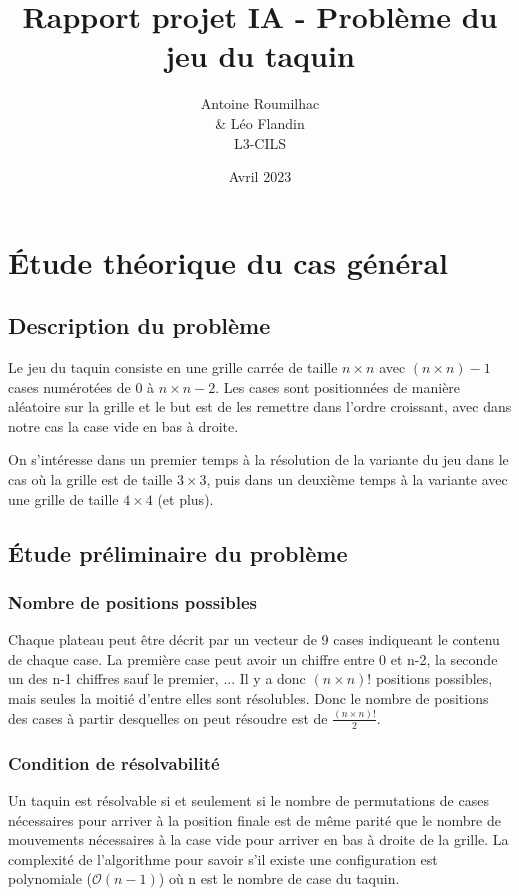 \documentclass[a4paper, 12pt]{article}
\title{Rapport projet IA - Problème du jeu du taquin}
\author{Antoine Roumilhac\\
    \& Léo Flandin\\
    L3-CILS}
\date{Avril 2023}
\begin{document}
\maketitle

\section{Étude théorique du cas général}

\subsection{Description du problème}
Le jeu du taquin consiste en une grille carrée de taille $n\times n$ avec $(n\times n) - 1$ cases numérotées de 0 à $n \times n - 2$.
Les cases sont positionnées de manière aléatoire sur la grille et le but est de les remettre dans l'ordre croissant, avec dans notre cas la case vide en bas à droite.


On s'intéresse dans un premier temps à la résolution de la variante du jeu dans le cas où la grille est de taille $3 \times 3$, puis dans un deuxième temps à la variante avec une grille de taille $4 \times 4$ (et plus).

\subsection{Étude préliminaire du problème}

\subsubsection{Nombre de positions possibles}
Chaque plateau peut être décrit par un vecteur de 9 cases indiqueant le contenu de chaque case. La première case peut avoir un chiffre entre 0 et n-2, la seconde un des n-1 chiffres sauf le premier, ...
Il y a donc $(n \times n)!$ positions possibles, mais seules la moitié d'entre elles sont résolubles.
Donc le nombre de positions des cases à partir desquelles on peut résoudre est de $\frac{(n\times n)!}{2}$.

\subsubsection{Condition de résolvabilité}
Un taquin est résolvable si et seulement si le nombre de permutations de cases nécessaires pour arriver à la position finale est de même parité que le nombre de mouvements nécessaires à la case vide pour arriver en bas à droite de la grille.
La complexité de l'algorithme pour savoir s'il existe une configuration est polynomiale ($\mathcal{O}(n-1)$) où n est le nombre de case du taquin.
\end{document}
